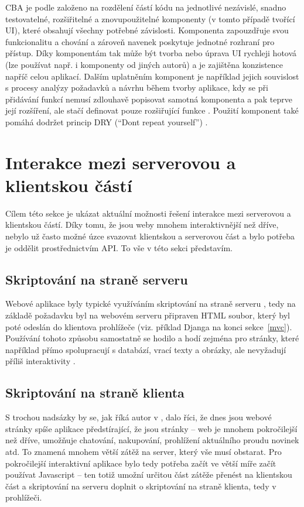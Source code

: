     CBA je podle \cite{cba3} založeno na rozdělení částí kódu na jednotlivé nezávislé, snadno testovatelné, rozšiřitelné a znovupoužitelné komponenty (v tomto případě tvořící UI), které obsahují všechny potřebné závislosti. Komponenta zapouzdřuje svou funkcionalitu a chování a zároveň navenek poskytuje jednotné rozhraní pro přístup. Díky komponentám tak může být tvorba nebo úprava UI rychleji hotová (lze používat např. i komponenty od jiných autorů) a je zajištěna konzistence napříč celou aplikací. Dalším uplatněním komponent je například jejich souvislost s procesy analýzy požadavků a návrhu během tvorby aplikace, kdy se při přidávání funkcí nemusí zdlouhavě popisovat samotná komponenta a pak teprve její rozšíření, ale stačí definovat pouze rozšiřující funkce \cite{cba1}. Použití komponent také pomáhá dodržet princip DRY (\enquote{Don\textquotesingle t repeat yourself}) \cite{cba2}.
    
    \section{Interakce mezi serverovou a klientskou částí}\label{interakce}
    Cílem této sekce je ukázat aktuální možnosti řešení interakce mezi serverovou a klientskou částí. Díky tomu, že jsou weby mnohem interaktivnější než dříve, nebylo už často možné úzce svazovat klientskou a serverovou část a bylo potřeba je oddělit prostřednictvím API. To vše v této sekci představím.
    
        \subsection{Skriptování na straně serveru}
        Webové aplikace byly typické využíváním skriptování na straně serveru \cite{moderni-webapps}, tedy na základě požadavku byl na webovém serveru připraven HTML soubor, který byl poté odeslán do klientova prohlížeče \cite{scripting-sqa} (viz. příklad Djanga na konci sekce~\ref{mvc}). Používání tohoto způsobu samostatně se hodilo a hodí zejména pro stránky, které například přímo spolupracují s databází, vrací texty a obrázky, ale nevyžadují příliš interaktivity \cite{scripting-freecodecamp}.
        
        \subsection{Skriptování na straně klienta}\label{client-side-scripting}
        S trochou nadsázky by se, jak říká autor v \cite{scripting-freecodecamp}, dalo říci, že dnes jsou webové stránky spíše aplikace předstírající, že jsou stránky -- web je mnohem pokročilejší než dříve, umožňuje chatování, nakupování, prohlížení aktuálního proudu novinek atd. To znamená mnohem větší zátěž na server, který vše musí obstarat. Pro pokročilejší interaktivní aplikace bylo tedy potřeba začít ve větší míře začít používat Javascript -- ten totiž umožní určitou část zátěže přenést na klientskou část \cite{scripting-upwork} a skriptování na serveru doplnit o skriptování na straně klienta, tedy v prohlížeči.
        
